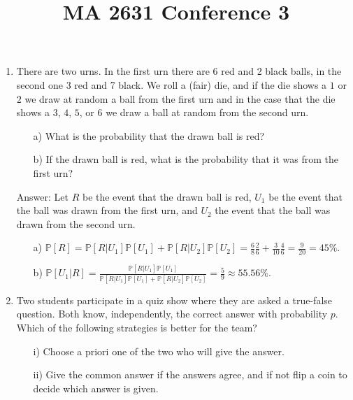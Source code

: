 \documentclass{article}
\title{MA 2631 Conference 3}
\begin{document}
\maketitle
\begin{enumerate}


\item There are two urns. In the first urn there are 6 red and 2 black balls, in the second one 3 red and 7 black. We roll a (fair) die, and if the die shows a $1$ or $2$ we draw at random a ball from the first urn and in the case that the die shows a $3$, $4$, $5$, or $6$ we draw a ball at random from the second urn.
\begin{itemize}
	\item[a)] What is the probability that the drawn ball is red?
	\item[b)] If the drawn ball is red, what is the probability that it was from the first urn?
\end{itemize}


Answer: Let $R$ be the event that the drawn ball is red, $U_1$ be the event that the ball was drawn from the first urn, and $U_2$ the event that the ball was drawn from the second urn.

\begin{itemize}

\item[a)] $\mathbb{P}[R] = \mathbb{P}[R  | U_1]\mathbb{P}[U_1] + \mathbb{P}[R | U_2] \mathbb{P}[U_2] = \frac{6}{8}\frac{2}{6} + \frac{3}{10}\frac{4}{6} = \frac{9}{20} = 45\%$.

\item[b)] $\mathbb{P}[ U_1 | R] = \frac{\mathbb{P}[R | U_1]\mathbb{P}[U_1]}{\mathbb{P}[R | U_1] \mathbb{P}[U_1] + \mathbb{P}[R | U_2] \mathbb{P}[U_2]} = \frac{5}{9} \approx 55.56\%$.
\end{itemize}


\item
Two students participate in a quiz show where they are asked a true-false question. Both know, independently, the correct answer with probability $p$. Which of the following strategies is better for the team?

\begin{itemize}
	\item[i)] Choose a priori one of the two who will give the answer.
	\item[ii)] Give the common answer if the answers agree, and if not flip a coin to decide which answer is given.
\end{itemize}


\end{enumerate}
\end{document}
